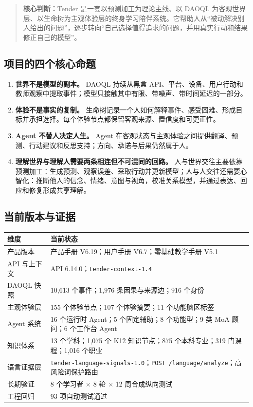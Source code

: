 \documentclass[UTF8,a4paper,11pt]{ctexart}
\newcommand{\keypoint}[1]{\begin{quote}\noindent\textbf{\color{TenderBlue}核心判断：}#1\end{quote}}
\begin{document}
\keypoint{Tender 是一套以预测加工为理论主线、以 DAOQL 为客观世界层、以生命树为主观体验层的终身学习陪伴系统。它帮助人从“被动解决别人给出的问题”，逐步转向“自己选择值得追求的问题，并用真实行动和结果修正自己的模型”。}

\subsection{项目的四个核心命题}

\begin{enumerate}
\item \textbf{世界不是模型的副本。} DAOQL 持续从黑盒 API、平台、设备、用户行动和教师观察中提取事件；模型只接触其中有限、带噪声、带时间延迟的一部分。
\item \textbf{体验不是事实的复制。} 生命树记录一个人如何解释事件、感受困难、形成目标并承担选择。每个体验节点都保留客观来源、置信度和可更正性。
\item \textbf{Agent 不替人决定人生。} Agent 在客观状态与主观体验之间提供翻译、预测、行动建议和反思支持；方向、承诺与后果仍然属于人。
\item \textbf{理解世界与理解人需要两条相连但不可混同的回路。} 人与世界交往主要依靠预测加工：生成预测、观察误差、采取行动并更新模型；人与人交往还需要心智化：推断他人的信念、情绪、意图与视角，校准关系模型，并通过表达、回应和修复形成共享理解。
\end{enumerate}

\subsection{当前版本与证据}

\begin{center}
\begin{tabularx}{\textwidth}{@{}p{4.6cm}X@{}}
\toprule
\textbf{维度} & \textbf{当前状态} \\
\midrule
产品版本 & 产品手册 V6.19；用户手册 V6.7；零基础教学手册 V5.1 \\
API 与上下文 & API 6.14.0；\texttt{tender-context-1.4} \\
DAOQL 快照 & 10,613 个事件；1,976 条因果与来源边；916 个身份 \\
主观体验层 & 155 个体验节点；107 个体验摘要；11 个功能脑区标签 \\
Agent 系统 & 16 个运行时 Agent；5 个固定辅助；8 个功能型；9 类 MoA 顾问；6 个工作台 Agent \\
知识体系 & 13 个学科；1,075 个 K12 知识节点；875 个本科专业；319 门课程；1,016 个职业 \\
语言证据层 & \texttt{tender-language-signals-1.0}；\texttt{POST /language/analyze}；高风险词保护路由 \\
长期验证 & 8 个学习者 × 8 轮 × 12 周合成纵向测试 \\
工程回归 & 93 项自动测试通过 \\
\bottomrule
\end{tabularx}
\end{center}
\end{document}
